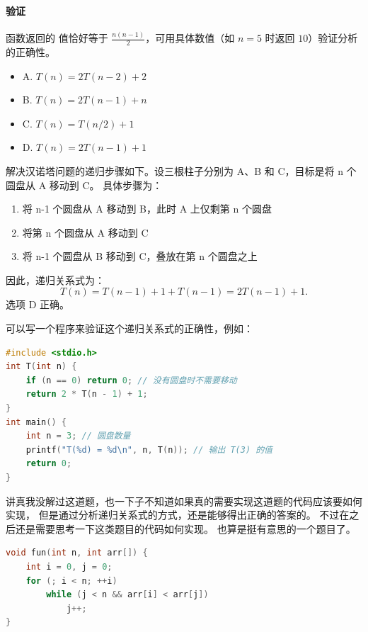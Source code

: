 \documentclass[b5paper,11pt]{article}
\begin{document}
\paragraph{验证} 函数返回的  值恰好等于 \(\frac{n(n-1)}{2}\)，可用具体数值（如 \(n=5\) 时返回 \(10\)）验证分析的正确性。

\dhr

\begin{itemize}
  \item A. \(T(n) = 2T(n-2) + 2\)
  \item B. \(T(n) = 2T(n-1) + n\)
  \item C. \(T(n) = T(n/2) + 1\)
  \item D. \(T(n) = 2T(n-1) + 1\)
\end{itemize}

解决汉诺塔问题的递归步骤如下。设三根柱子分别为 A、B 和 C，目标是将 n 个圆盘从 A 移动到 C。
具体步骤为：
\begin{enumerate}
  \item 将 n-1 个圆盘从 A 移动到 B，此时 A 上仅剩第 n 个圆盘
  \item 将第 n 个圆盘从 A 移动到 C
  \item 将 n-1 个圆盘从 B 移动到 C，叠放在第 n 个圆盘之上
\end{enumerate}
因此，递归关系式为：
\[
  T(n) = T(n-1) + 1 + T(n-1) = 2T(n-1) + 1.
\]
选项 D 正确。

可以写一个程序来验证这个递归关系式的正确性，例如：
\begin{lstlisting}[language=C]
#include <stdio.h>
int T(int n) {
    if (n == 0) return 0; // 没有圆盘时不需要移动
    return 2 * T(n - 1) + 1;
}
int main() {
    int n = 3; // 圆盘数量
    printf("T(%d) = %d\n", n, T(n)); // 输出 T(3) 的值
    return 0;
}
\end{lstlisting}

\begin{cquote}
  讲真我没解过这道题，也一下子不知道如果真的需要实现这道题的代码应该要如何实现，
  但是通过分析递归关系式的方式，还是能够得出正确的答案的。
  不过在之后还是需要思考一下这类题目的代码如何实现。
  也算是挺有意思的一个题目了。
\end{cquote}

\dhr

\begin{lstlisting}[language=C]
void fun(int n, int arr[]) {
    int i = 0, j = 0;
    for (; i < n; ++i)
        while (j < n && arr[i] < arr[j])
            j++;
}
\end{lstlisting}
\end{document}

